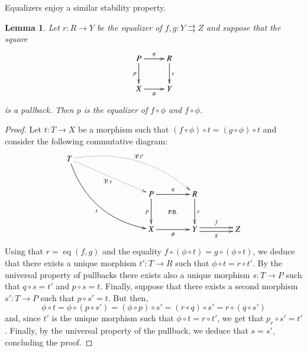 \documentclass[12pt]{article}
\newtheorem{lemma}{Lemma}[section]
\theoremstyle{definition}
\def\X{\mathfrak X}
\DeclareMathOperator{\eq}{eq}
\numberwithin{equation}{section}
\begin{document}
Equalizers enjoy  a similar stability property.
\begin{lemma}\label{reg} 
	Let $r\colon R\rightarrow Y$ be the equalizer of $f, g: Y\rightrightarrows Z$ and suppose that the square
	\[\xymatrix{P\ar[r]^{q}\ar[d]_{p}&R\ar[d]^{r}\\X\ar[r]_{\phi}&Y}
	\]
	is a pullback. Then $p$ is the equalizer of $f\circ \phi$ and $f\circ \phi$.
\end{lemma}
\begin{proof}Let $t\colon T\to X$ be a morphism such that $(f\circ\phi)\circ t=(g\circ\phi)\circ t$ and consider the following commutative diagram:
	\[
	\xymatrix@R=30pt@C=40pt{
		T\ar@/_20pt/[ddrr]_t\ar@{.>}@/_-20pt/[drrr]^{\exists!\, t'}\ar@{.>}[drr]_{\exists!\, s}\\
		&&P\ar@{}[dr]|{\text{P.B.}}\ar[r]^{q}\ar[d]_{p}&R\ar[d]^r\\
		&&X\ar[r]_{\phi}&Y\ar@<-.5ex>[r]_-{g} \ar@<.5ex>[r]^-{f}&Z 
	}
	\]
	Using that $r=\eq(f,g)$ and the equality $f\circ(\phi\circ t)=g\circ(\phi\circ t)$, we deduce that there exists a unique morphism $t'\colon T\to R$ such that $\phi\circ t=r\circ t'$. By the universal property of pullbacks there exists also a unique morphism $s\colon T\to P$ such that $q\circ s=t'$ and $p\circ s=t$. Finally, suppose that there exists a second morphism $s'\colon T\to P$ such that $p\circ s'=t$. But then, \[\phi\circ t=\phi\circ (p\circ s')=(\phi\circ p)\circ s'=(r\circ q)\circ s'=r\circ (q\circ s')\] and, since $t'$ is the unique morphism such that  $\phi\circ t=r\circ t'$, we get that $p_r\circ s'=t'$. Finally, by the universal property of the pullback, we deduce that $s=s'$, concluding the proof.

\end{proof}
\end{document}
